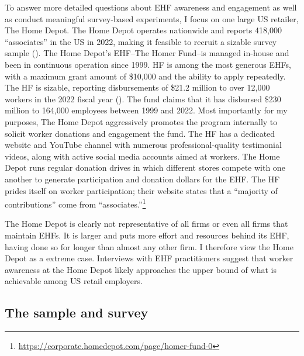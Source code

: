 \documentclass[
  11pt,
  oneside]{article}
\begin{document}
To answer more detailed questions about EHF awareness and engagement as well as conduct meaningful survey-based experiments, I focus on one large US retailer, The Home Depot. The Home Depot operates nationwide and reports 418,000 ``associates'' in the US in 2022, making it feasible to recruit a sizable survey sample (). The Home Depot's EHF--The Homer Fund--is managed in-house and been in continuous operation since 1999. HF is among the most generous EHFs, with a maximum grant amount of \$10,000 and the ability to apply repeatedly. The HF is sizable, reporting disbursements of \$21.2 million to over 12,000 workers in the 2022 fiscal year (). The fund claims that it has disbursed \$230 million to 164,000 employees between 1999 and 2022. Most importantly for my purposes, The Home Depot aggressively promotes the program internally to solicit worker donations and engagement the fund. The HF has a dedicated website and YouTube channel with numerous professional-quality testimonial videos, along with active social media accounts aimed at workers. The Home Depot runs regular donation drives in which different stores compete with one another to generate participation and donation dollars for the EHF. The HF prides itself on worker participation; their website states that a ``majority of contributions'' come from ``associates.''\footnote{\url{https://corporate.homedepot.com/page/homer-fund-0}}

The Home Depot is clearly not representative of all firms or even all firms that maintain EHFs. It is larger and puts more effort and resources behind its EHF, having done so for longer than almost any other firm. I therefore view the Home Depot as a extreme case. Interviews with EHF practitioners suggest that worker awareness at the Home Depot likely approaches the upper bound of what is achievable among US retail employers.

\subsection{The sample and survey}\label{the-sample-and-survey}
\end{document}
